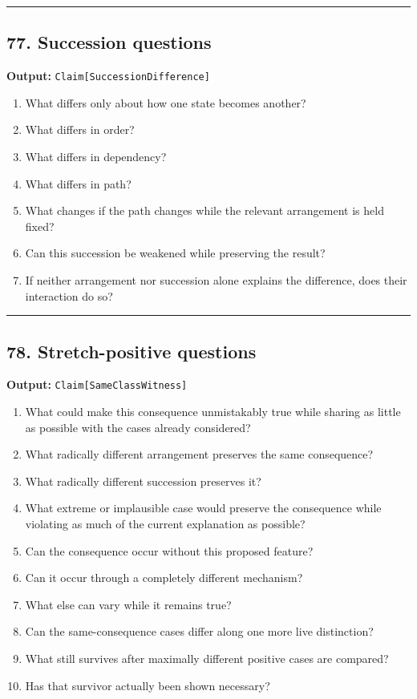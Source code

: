 \documentclass[
]{article}
\providecommand{\tightlist}{%
  \setlength{\itemsep}{0pt}\setlength{\parskip}{0pt}}
\begin{document}
\begin{center}\rule{0.5\linewidth}{0.5pt}\end{center}

\subsection{77. Succession questions}\label{succession-questions}

\textbf{Output:} \texttt{Claim{[}SuccessionDifference{]}}

\begin{enumerate}
\def\labelenumi{\arabic{enumi}.}
\tightlist
\item
  What differs only about how one state becomes another?
\item
  What differs in order?
\item
  What differs in dependency?
\item
  What differs in path?
\item
  What changes if the path changes while the relevant arrangement is
  held fixed?
\item
  Can this succession be weakened while preserving the result?
\item
  If neither arrangement nor succession alone explains the difference,
  does their interaction do so?
\end{enumerate}

\begin{center}\rule{0.5\linewidth}{0.5pt}\end{center}

\subsection{78. Stretch-positive
questions}\label{stretch-positive-questions}

\textbf{Output:} \texttt{Claim{[}SameClassWitness{]}}

\begin{enumerate}
\def\labelenumi{\arabic{enumi}.}
\tightlist
\item
  What could make this consequence unmistakably true while sharing as
  little as possible with the cases already considered?
\item
  What radically different arrangement preserves the same consequence?
\item
  What radically different succession preserves it?
\item
  What extreme or implausible case would preserve the consequence while
  violating as much of the current explanation as possible?
\item
  Can the consequence occur without this proposed feature?
\item
  Can it occur through a completely different mechanism?
\item
  What else can vary while it remains true?
\item
  Can the same-consequence cases differ along one more live distinction?
\item
  What still survives after maximally different positive cases are
  compared?
\item
  Has that survivor actually been shown necessary?
\end{enumerate}
\end{document}
